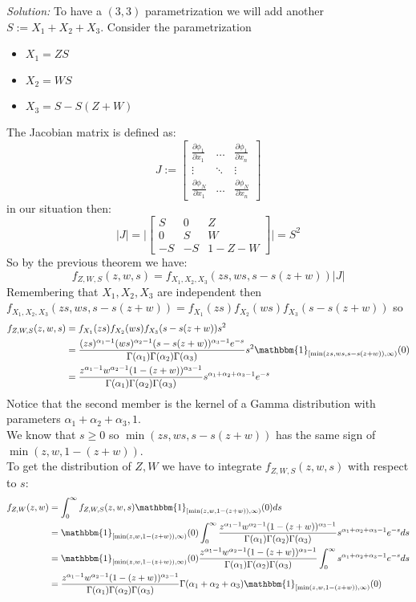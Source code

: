 \begin{ex}
\textit{Solution:}
To have a $(3,3)$ parametrization we will add another \rv $S:=X_1+X_2+X_3$.
Consider the parametrization
\begin{itemize}
\item $X_1=ZS$
\item $X_2=WS$
\item $X_3=S-S(Z+W)$
\end{itemize}
The Jacobian matrix is defined as:
\[J:=\begin{bmatrix}
\frac{\partial \phi_1}{\partial x_1} & \dots  & \frac{\partial \phi_1}{\partial x_n} \\
\vdots &  \ddots & \vdots \\
\frac{\partial \phi_N}{\partial x_1} &  \dots  & \frac{\partial \phi_N}{\partial x_n}
\end{bmatrix}	
\]
in our situation then:
\[
|J|=\Bigg| \begin{bmatrix}
S & 0  & Z \\
0 &  S & W \\
-S &  -S  & 1-Z-W
\end{bmatrix}	
\Bigg|=S^2
\]
So by the previous theorem we have:
\[f_{Z,W,S}(z,w,s) = f_{X_1,X_2,X_3}(zs,ws,s-s(z+w)) |J|
\]
Remembering that $X_1,X_2,X_3$ are independent then $f_{X_1,X_2,X_3}(zs,ws,s-s(z+w))=f_{X_1}(zs)f_{X_2}(ws)f_{X_3}(s-s(z+w))$
so
\[
\begin{split}
f_{Z,W,S}(z,w,s)
& =f_{X_1}(zs)f_{X_2}(ws)f_{X_3}(s-s(z+w))s^2\\
&=\frac{(zs)^{\alpha_1-1}(ws)^{\alpha_2-1}(s-s(z+w))^{\alpha_3-1}e^{- s}}{\Gamma(\alpha_1)\Gamma(\alpha_2)\Gamma(\alpha_3)} s^2 \mathbbm{1}_{[\min(zs,ws,s-s(z+w)),\infty)}(0)\\
&=\frac{z^{\alpha_1-1}w^{\alpha_2-1} (1-(z+w))^{\alpha_3-1}}{\Gamma (\alpha_1)\Gamma (\alpha_2)\Gamma (\alpha_3)}s^{\alpha_1+\alpha_2+\alpha_3-1} e^{-s}
\end{split}
\]
Notice that the second member is the kernel of a Gamma distribution with parameters $\alpha_1+\alpha_2+\alpha_3, 1$.\\
We know that $s\geq 0$ so $\min(zs,ws,s-s(z+w))$ has the same sign of $\min(z,w,1-(z+w))$.\\
To get the distribution of $Z,W$ we have to integrate $f_{Z,W,S}(z,w,s)$ with respect to $s$:
\[
\begin{split}
f_{Z,W}(z,w)
&=\int_{0}^{\infty}f_{Z,W,S}(z,w,s)\mathbbm{1}_{[\min(z,w,1-(z+w)),\infty)}(0)ds\\
&=\mathbbm{1}_{[\min(z,w,1-(z+w)),\infty)}(0)\int_{0}^{\infty}\frac{z^{\alpha_1-1}w^{\alpha_2-1} (1-(z+w))^{\alpha_3-1}}{\Gamma (\alpha_1)\Gamma (\alpha_2)\Gamma (\alpha_3)}s^{\alpha_1+\alpha_2+\alpha_3-1} e^{-s}ds\\
&=\mathbbm{1}_{[\min(z,w,1-(z+w)),\infty)}(0)\frac{z^{\alpha_1-1}w^{\alpha_2-1} (1-(z+w))^{\alpha_3-1}}{\Gamma (\alpha_1)\Gamma (\alpha_2)\Gamma (\alpha_3)} \int_{0}^{\infty}s^{\alpha_1+\alpha_2+\alpha_3-1} e^{-s}ds\\
&=\frac{z^{\alpha_1-1}w^{\alpha_2-1} (1-(z+w))^{\alpha_3-1}}{\Gamma (\alpha_1)\Gamma (\alpha_2)\Gamma (\alpha_3)}\Gamma(\alpha_1+\alpha_2+\alpha_3)\mathbbm{1}_{[\min(z,w,1-(z+w)),\infty)}(0)
\end{split}
\]
\end{ex}
